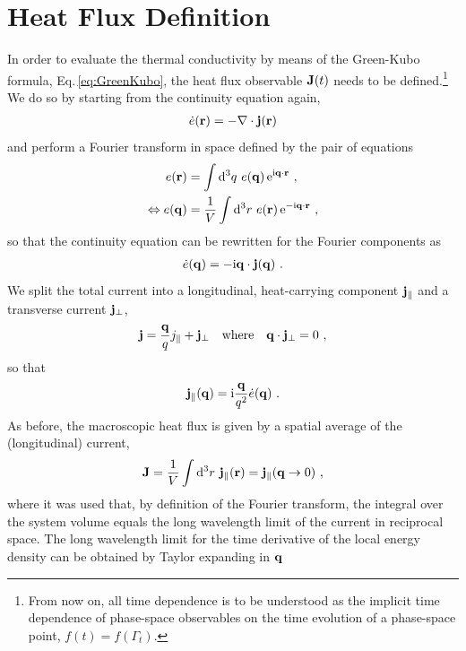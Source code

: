 \section{Heat Flux Definition}
In order to evaluate the thermal conductivity by means of the Green-Kubo formula, Eq.\,\eqref{eq:GreenKubo}, the  heat flux observable ${\bf J} (t)$ needs to be defined.\footnote{From now on, all time dependence is to be understood as the implicit time dependence of phase-space observables on the time evolution of a phase-space point, $f(t) = f(\Gamma_t)$.} We do so by starting from the continuity equation again,
\begin{align}
	\dot{e} (\b r) = - \b \nabla \cdot \b j (\b r)
	\label{eq:hf.cont}
\end{align}
and perform a Fourier transform in space defined by the pair of equations
\begin{align}
	e(\b r) 
		&= \int \d^3 q ~ e(\b q) \, {\rm e}^{\im \b q \cdot \b r} ~,
		\label{eq:hf.ft.r} \\
	\Leftrightarrow
	e(\b q) 
		&= \frac{1}{V} \int \d^3 r ~ e(\b r) \, {\rm e}^{-\im \b q \cdot \b r} ~,
	\label{eq:hf.ft.2}
\end{align}
so that the continuity equation can be rewritten for the Fourier components as
\begin{align}
	\dot{e} (\b q)
		= - \im \b q \cdot \b j (\b q)~.
	\label{eq:hf.ft.cont.q}
\end{align}
We split the total current into a longitudinal, heat-carrying component ${\bf j}_{\parallel}$ and a transverse current ${\bf j}_{\perp}$,
\begin{align}
	{\bf j} = \frac{{\bf q}}{q} j_{\parallel} + {\bf j}_{\perp} \quad\text{where}\quad {\bf q} \cdot {\bf j}_{\perp} = 0~,
\end{align}
so that
\begin{align}
	\b j_{\parallel} (\b q)
		= \im \frac{\b q}{q^2} \dot{e} (\b q)~.
  \label{eq:hf.j.parallel}
\end{align}
As before, the macroscopic heat flux is given by a spatial average of the (longitudinal) current,
\begin{align}
	\b J = \frac{1}{V} \int \d^3 r ~ \b j_{\parallel} (\b r) = \b j_{\parallel} (\b q \to 0)~,
	\label{eq:hf.J.1}
\end{align}
where it was used that, by definition of the Fourier transform, the integral over the system volume equals the long wavelength limit of the current in reciprocal space. The long wavelength limit for the time derivative of the local energy density can be obtained by Taylor expanding in ${\bf q}$
